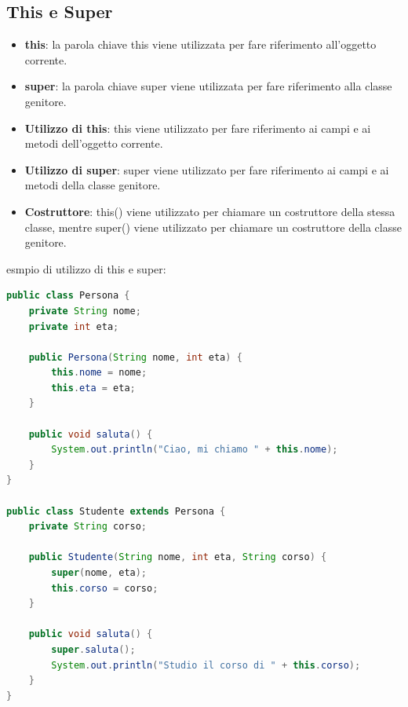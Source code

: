 \documentclass[11pt]{article}
\begin{document}
\subsection{This e Super}
\begin{itemize}
    \item \textbf{this}: la parola chiave this viene utilizzata per fare riferimento all'oggetto corrente.
    \item \textbf{super}: la parola chiave super viene utilizzata per fare riferimento alla classe genitore.
    \item \textbf{Utilizzo di this}: this viene utilizzato per fare riferimento ai campi e ai metodi dell'oggetto corrente.
    \item \textbf{Utilizzo di super}: super viene utilizzato per fare riferimento ai campi e ai metodi della classe genitore.
    \item \textbf{Costruttore}: this() viene utilizzato per chiamare un costruttore della stessa classe, mentre super() viene utilizzato per chiamare un costruttore della classe genitore.
\end{itemize}
esmpio di utilizzo di this e super:
\begin{lstlisting}[language=Java]
public class Persona {
    private String nome;
    private int eta;

    public Persona(String nome, int eta) {
        this.nome = nome;
        this.eta = eta;
    }

    public void saluta() {
        System.out.println("Ciao, mi chiamo " + this.nome);
    }
}

public class Studente extends Persona {
    private String corso;

    public Studente(String nome, int eta, String corso) {
        super(nome, eta);
        this.corso = corso;
    }

    public void saluta() {
        super.saluta();
        System.out.println("Studio il corso di " + this.corso);
    }
}
\end{lstlisting}
\end{document}
